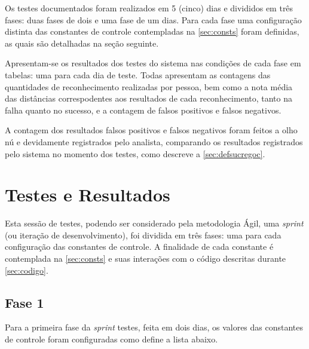 Os testes documentados foram realizados em 5 (cinco) dias e divididos em três fases: duas fases de dois e uma fase de um dias. Para cada fase uma configuração distinta das constantes de controle contempladas na \autoref{sec:consts} foram definidas, as quais são detalhadas na seção seguinte.

Apresentam-se os resultados dos testes do sistema nas condições de cada fase em tabelas: uma para cada dia de teste. Todas apresentam as contagens das quantidades de reconhecimento realizadas por pessoa, bem como a nota média das distâncias correspodentes aos resultados de cada reconhecimento, tanto na falha quanto no sucesso, e a contagem de falsos positivos e falsos negativos.

A contagem dos resultados falsos positivos e falsos negativos foram feitos a olho nú e devidamente registrados pelo analista, comparando os resultados registrados pelo sistema no momento dos testes, como descreve a \autoref{sec:defsucregoc}.

\section{Testes e Resultados}\label{ch:testresult}

Esta sessão de testes, podendo ser considerado pela metodologia Ágil, uma \textit{sprint} (ou iteração de desenvolvimento), foi dividida em três fases: uma para cada configuração das constantes de controle. A finalidade de cada constante é contemplada na \autoref{sec:consts} e suas interações com o código descritas durante \autoref{sec:codigo}.


\subsection{Fase 1}\label{ch:testresultfaz1}
Para a primeira fase da \textit{sprint} testes, feita em dois dias, os valores das constantes de controle foram configuradas como define a lista abaixo.

